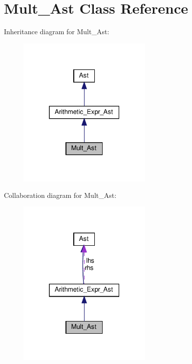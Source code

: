\hypertarget{classMult__Ast}{}\section{Mult\+\_\+\+Ast Class Reference}
\label{classMult__Ast}


Inheritance diagram for Mult\+\_\+\+Ast\+:
\nopagebreak
\begin{figure}[H]
\begin{center}
\leavevmode
\includegraphics[width=187pt]{classMult__Ast__inherit__graph}
\end{center}
\end{figure}


Collaboration diagram for Mult\+\_\+\+Ast\+:
\nopagebreak
\begin{figure}[H]
\begin{center}
\leavevmode
\includegraphics[width=187pt]{classMult__Ast__coll__graph}
\end{center}
\end{figure}
